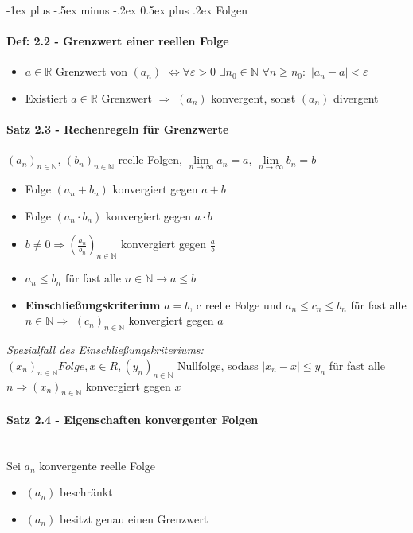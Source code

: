 \documentclass[paper=a3,paper=landscape, fontsize=9pt,DIV=25]{scrartcl}
\makeatletter
\newcommand{\real}{{\mathbb{R}}}
\newcommand{\nat}{\mathbb{N}}
\renewcommand{\section}{\@startsection{section}{1}{0mm}%
  {-1ex plus -.5ex minus -.2ex}%
  {0.5ex plus .2ex}%
  {\color{blue}\normalfont\large\bfseries}}
\makeatother
\begin{document}
\begin{multicols*}{4}

  \section{Folgen}


  \paragraph{Def: 2.2 - Grenzwert einer reellen Folge}
  \begin{itemize}
  \item $a \in \real$ Grenzwert von $(a_n)$ $\Leftrightarrow \forall \varepsilon > 0$ $\exists n_0 \in \nat$ $\forall n \geq n_0:$ $|a_n - a| < \varepsilon$
  \item Existiert $a \in \real$ Grenzwert $\Rightarrow$ $(a_n)$ konvergent, sonst $(a_n)$ divergent
  \end{itemize}


  \paragraph{Satz 2.3 - Rechenregeln für Grenzwerte}
  $(a_n)_{n \in \nat}$, $(b_n)_{n \in \nat}$ reelle Folgen, $\lim\limits_{n \rightarrow \infty} a_n = a$, $\lim\limits_{n \rightarrow \infty} b_n = b$
  \begin{itemize}
  \item Folge $(a_n + b_n)$ konvergiert gegen $a+b$
  \item Folge $(a_n \cdot b_n)$ konvergiert gegen $a \cdot b$
  \item $b \neq 0 \Rightarrow (\frac{a_n}{b_n})_{n \in \nat}$ konvergiert gegen $\frac{a}{b}$
  \item $a_n \leq b_n$ für fast alle $n \in \nat \rightarrow a \leq b$
  \item \textbf{Einschließungskriterium} $a=b$, c reelle Folge und $a_n \leq c_n \leq b_n$ für fast alle $n \in \nat \Rightarrow$ $(c_n)_{n \in \nat}$ konvergiert gegen $a$
  \end{itemize}

  \textit{Spezialfall des Einschließungskriteriums:}\\$(x_n)_{n \in \nat} Folge, x \in R, (y_n)_{n \in \nat}$ Nullfolge, sodass $|x_n -x| \leq y_n$ für fast alle $n \Rightarrow (x_n)_{n \in \nat}$ konvergiert gegen $x$


  \paragraph{Satz 2.4 - Eigenschaften konvergenter Folgen}\hspace{0pt} \\
  Sei $a_n$ konvergente reelle Folge
  \begin{itemize}
  \item $(a_n)$ beschränkt
  \item $(a_n)$ besitzt genau einen Grenzwert
  \end{itemize}



\end{multicols*}
\end{document}

